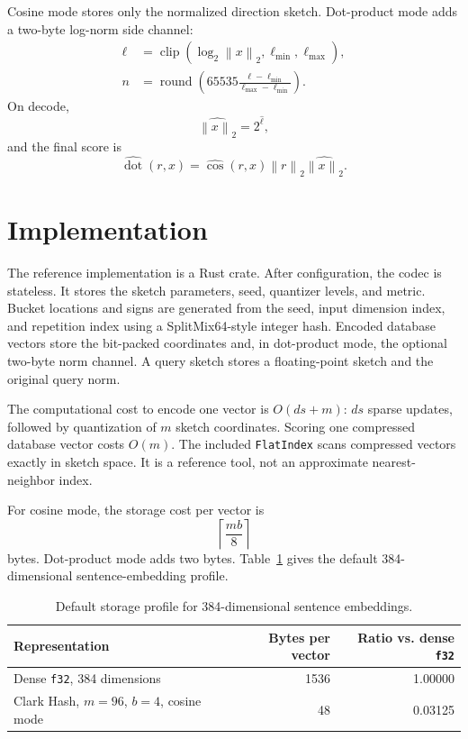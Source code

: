 \documentclass[11pt]{article}
\newcommand{\norm}[1]{\left\lVert #1 \right\rVert_2}
\newcommand{\code}[1]{\texttt{#1}}
\begin{document}
Cosine mode stores only the normalized direction sketch. Dot-product mode adds a
two-byte log-norm side channel:
\begin{align}
\ell &= \operatorname{clip}(\log_2\norm{x},\ell_{\min},\ell_{\max}),\\
n &= \operatorname{round}\!\left(
65535 \frac{\ell-\ell_{\min}}{\ell_{\max}-\ell_{\min}}
\right).
\end{align}
On decode,
\begin{equation}
\widehat{\norm{x}} = 2^{\hat{\ell}},
\end{equation}
and the final score is
\begin{equation}
\widehat{\operatorname{dot}}(r,x)
= \widehat{\cos}(r,x)\norm{r}\widehat{\norm{x}}.
\end{equation}

\section{Implementation}

The reference implementation is a Rust crate. After configuration, the codec is
stateless. It stores the sketch parameters, seed, quantizer levels, and metric.
Bucket locations and signs are generated from the seed, input dimension index,
and repetition index using a SplitMix64-style integer hash. Encoded database
vectors store the bit-packed coordinates and, in dot-product mode, the optional
two-byte norm channel. A query sketch stores a floating-point sketch and the
original query norm.

The computational cost to encode one vector is $O(ds+m)$: $ds$ sparse updates,
followed by quantization of $m$ sketch coordinates. Scoring one compressed
database vector costs $O(m)$. The included \code{FlatIndex} scans compressed
vectors exactly in sketch space. It is a reference tool, not an approximate
nearest-neighbor index.

For cosine mode, the storage cost per vector is
\begin{equation}
\left\lceil\frac{mb}{8}\right\rceil
\end{equation}
bytes. Dot-product mode adds two bytes. Table~\ref{tab:storage} gives the
default 384-dimensional sentence-embedding profile.

\begin{table}[t]
\centering
\caption{Default storage profile for 384-dimensional sentence embeddings.}
\label{tab:storage}
\begin{tabular}{lrr}
\toprule
Representation & Bytes per vector & Ratio vs. dense \code{f32} \\
\midrule
Dense \code{f32}, 384 dimensions & 1536 & 1.00000 \\
Clark Hash, $m=96$, $b=4$, cosine mode & 48 & 0.03125 \\
\bottomrule
\end{tabular}
\end{table}
\end{document}
